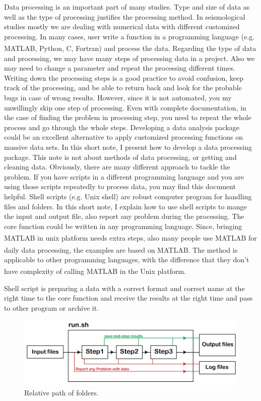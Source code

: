 Data processing is an important part of many studies. Type and size of data as well as the type of processing justifies the processing method. In seismological studies mostly we are dealing with numerical data with different customized processing. In many cases, user write a function in a programming language (e.g. MATLAB\textsuperscript{\textregistered}, Python, C, Fortran) and process the data. Regarding the type of data and processing, we may have many steps of processing data in a project. Also we may need to change a parameter and repeat the processing different times.  Writing down the processing steps is a good practice to avoid confusion, keep track of the processing, and be able to return back and look for the probable bugs in case of wrong results. However, since it is not automated, you my unwillingly skip one step of processing. Even with complete documentation, in the case of finding the problem in processing step, you need to repeat the whole process and go through the whole steps. Developing a data analysis package could be an excellent alternative to apply customized processing functions on massive data sets. In this short note, I present how to develop a data processing package. This note is not about methods of data processing, or getting and cleaning data. Obviously, there are many different approach to tackle the problem. If you have  scripts in a different programming language and you are using those scripts repeatedly to process data, you may find this document helpful. Shell scripts (e.g. Unix shell) are robust computer program for handling files and folders. In this short note, I explain how to use shell scripts to mange the input and output file, also report any problem during the processing. The core function could be written in any programming language. Since, bringing MATLAB\textsuperscript{\textregistered} in unix platform needs extra steps, also many people use MATLAB\textsuperscript{\textregistered} for daily data processing, the examples are based on MATLAB\textsuperscript{\textregistered}. The method is applicable to other programming languages, with the difference that they don't have complexity of calling MATLAB\textsuperscript{\textregistered} in the Unix platform.

Shell script is preparing a data with a correct format and correct name at the right time to the core function and receive the results at the right time and pass to other program or archive it.

\begin{figure} [ht]
\centering
\includegraphics[scale=0.6]{figures/pdf/Figure01.pdf} 
\caption{Relative path of folders.}
\label{fig:structure}
\end{figure}